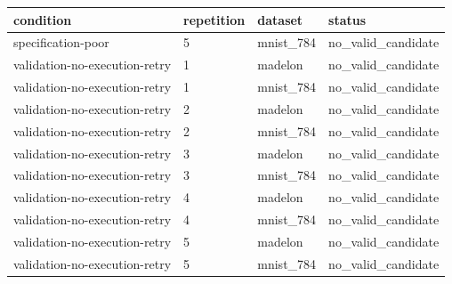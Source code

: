 \begin{tabular}{llll}
\hline
condition & repetition & dataset & status \\
\hline
specification-poor & 5 & mnist\_784 & no\_valid\_candidate \\
validation-no-execution-retry & 1 & madelon & no\_valid\_candidate \\
validation-no-execution-retry & 1 & mnist\_784 & no\_valid\_candidate \\
validation-no-execution-retry & 2 & madelon & no\_valid\_candidate \\
validation-no-execution-retry & 2 & mnist\_784 & no\_valid\_candidate \\
validation-no-execution-retry & 3 & madelon & no\_valid\_candidate \\
validation-no-execution-retry & 3 & mnist\_784 & no\_valid\_candidate \\
validation-no-execution-retry & 4 & madelon & no\_valid\_candidate \\
validation-no-execution-retry & 4 & mnist\_784 & no\_valid\_candidate \\
validation-no-execution-retry & 5 & madelon & no\_valid\_candidate \\
validation-no-execution-retry & 5 & mnist\_784 & no\_valid\_candidate \\
\hline
\end{tabular}
